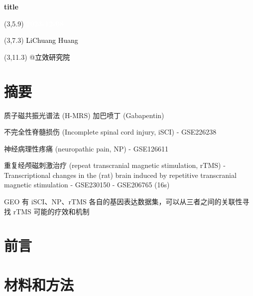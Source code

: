 \documentclass[
]{article}
\author{}
\date{\vspace{-2.5em}}
\begin{document}
\begin{titlepage} 
\begin{center} \textbf{\Huge title} \vspace{4em}
\begin{textblock}{10}(3,5.9) \huge
\textbf{\textcolor{white}{2023-12-08}}
\end{textblock} \begin{textblock}{10}(3,7.3)
\Large \textcolor{black}{LiChuang Huang}
\end{textblock} \begin{textblock}{10}(3,11.3)
\Large \textcolor{black}{@立效研究院}
\end{textblock} \end{center} \end{titlepage}
\restoregeometry


\tableofcontents

\listoffigures

\listoftables

\newpage


\hypertarget{abstract}{%
\section{摘要}\label{abstract}}

质子磁共振光谱法 (H-MRS)
加巴喷丁 (Gabapentin)

不完全性脊髓损伤 (Incomplete spinal cord injury, iSCI)
- GSE226238

神经病理性疼痛 (neuropathic pain, NP)
- GSE126611

重复经颅磁刺激治疗 (repeat transcranial magnetic stimulation, rTMS)
- Transcriptional changes in the (rat) brain induced by repetitive transcranial magnetic stimulation
- GSE230150
- GSE206765 (16s)

GEO 有 iSCI、NP、rTMS 各自的基因表达数据集，可以从三者之间的关联性寻找 rTMS 可能的疗效和机制

\hypertarget{introduction}{%
\section{前言}\label{introduction}}

\hypertarget{methods}{%
\section{材料和方法}\label{methods}}
\end{document}
